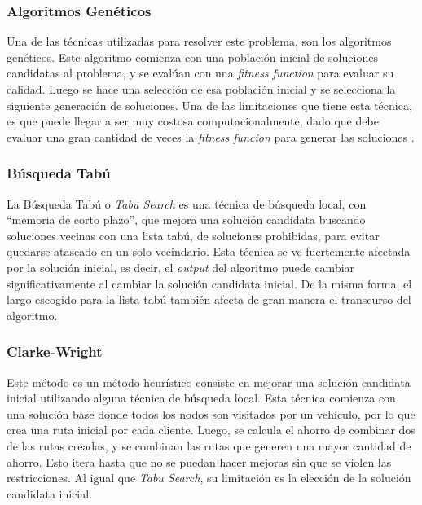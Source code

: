 \documentclass{article}
\begin{document}
\subsubsection{Algoritmos Genéticos}
Una de las técnicas utilizadas para resolver este problema, son los algoritmos genéticos. Este algoritmo comienza con una población inicial de soluciones candidatas al problema, y se evalúan con una \textit{fitness function} para evaluar su calidad. Luego se hace una selección de esa población inicial y se selecciona la siguiente generación de soluciones. Una de las limitaciones que tiene esta técnica, es que puede llegar a ser muy costosa computacionalmente, dado que debe evaluar una gran cantidad de veces la \textit{fitness funcion} para generar las soluciones \cite{ge2023genetic}. 

\subsubsection{Búsqueda Tabú}
La Búsqueda Tabú o \textit{Tabu Search} es una técnica de búsqueda local, con ``memoria de corto plazo'', que mejora una solución candidata buscando soluciones vecinas con una lista tabú, de soluciones prohibidas, para evitar quedarse atascado en un solo vecindario. Esta técnica se ve fuertemente afectada por la solución inicial, es decir, el \textit{output} del algoritmo puede cambiar significativamente al cambiar la solución candidata inicial. De la misma forma, el largo escogido para la lista tabú también afecta de gran manera el transcurso del algoritmo. \cite{xu2022model}
\subsubsection{Clarke-Wright}
Este método es un método heurístico consiste en mejorar una solución candidata inicial utilizando alguna técnica de búsqueda local. Esta técnica comienza con una solución base donde todos los nodos son visitados por un vehículo, por lo que crea una ruta inicial por cada cliente. Luego, se calcula el ahorro de combinar dos de las rutas creadas, y se combinan las rutas que generen una mayor cantidad de ahorro. Esto itera hasta que no se puedan hacer mejoras sin que se violen las restricciones. Al igual que \textit{Tabu Search}, su limitación es la elección de la solución candidata inicial\cite{talarico2015metaheuristics}\cite{talarico2017large}.
\end{document}
